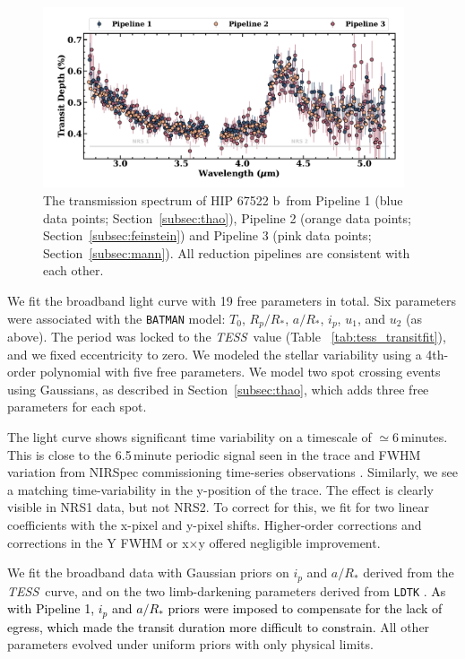 \documentclass[twocolumn]{aastex63} %
\newcommand{\tess}{\textit{TESS}}
\newcommand{\plname}{HIP 67522 b}
\newcommand{\newedit}[1]{\textcolor{black}{#1}}
\begin{document}
\begin{figure}[ht]
    \centering
    \includegraphics[width=0.95\textwidth]{hip67522_final_ts_v3.pdf}
    \caption{The transmission spectrum of \plname\ from Pipeline 1 (blue data points; Section~\ref{subsec:thao}), Pipeline 2 (orange data points; Section~\ref{subsec:feinstein}) and Pipeline 3 (pink data points; Section~\ref{subsec:mann}). All reduction pipelines are consistent with each other.    
    \label{fig:transspec}}
\end{figure} 
We fit the broadband light curve with 19 free parameters in total. Six parameters were associated with the \texttt{BATMAN} model: $T_0$, $R_p/R_*$, $a/R_*$, $i_p$, $u_1$, and $u_2$ (as above). The period was locked to the \tess\ value (Table ~\ref{tab:tess_transitfit}), and we fixed eccentricity to zero. We modeled the stellar variability using a 4th-order polynomial with five free parameters. We model two spot crossing events using Gaussians, as described in Section~\ref{subsec:thao}, which adds three free parameters for each spot. 

The light curve shows significant time variability on a timescale of $\simeq$6\,minutes. This is close to the 6.5\,minute periodic signal seen in the trace and FWHM variation from NIRSpec commissioning time-series observations \citep{Espinoza2023}. Similarly, we see a matching time-variability in the y-position of the trace. The effect is clearly visible in NRS1 data, but not NRS2. To correct for this, we fit for two linear coefficients with the x-pixel and y-pixel shifts. Higher-order corrections and corrections in the Y FWHM or x$\times$y offered negligible improvement. 

We fit the broadband data with Gaussian priors on $i_p$ and $a/R_*$ derived from the \tess\, curve, and on the two limb-darkening parameters derived from \texttt{LDTK} \citep{Parviainen2015}. \newedit{As with Pipeline 1, $i_p$ and $a/R_*$ priors were imposed to compensate for the lack of egress, which made the transit duration more difficult to constrain.} All other parameters evolved under uniform priors with only physical limits. 
\end{document}
